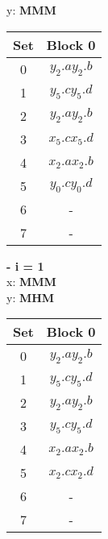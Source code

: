 \begin{enumerate}[label=\roman*. ]
y: \textbf{MMM}
\begin{table}[h!]
    \begin{tabular}{|c|c|}
    Set & Block 0 \\ \hline
    0 & $y_2.a$\quad$y_2.b$ \\ \hline
    1 & $y_5.c$\quad$y_5.d$ \\ \hline
    2 & $y_2.a$\quad$y_2.b$ \\ \hline
    3 & $x_5.c$\quad$x_5.d$ \\ \hline
    4 & $x_2.a$\quad$x_2.b$ \\ \hline
    5 & $y_0.c$\quad$y_0.d$ \\ \hline
    6 & - \\ \hline
    7 & - \\ \hline
    \end{tabular}
    \end{table}

\textbf{- i = 1}\\
x: \textbf{MMM}\\
y: \textbf{MHM}
\begin{table}[h!]
    \begin{tabular}{|c|c|}
    Set & Block 0 \\ \hline
    0 & $y_2.a$\quad$y_2.b$ \\ \hline
    1 & $y_5.c$\quad$y_5.d$ \\ \hline
    2 & $y_2.a$\quad$y_2.b$ \\ \hline
    3 & $y_5.c$\quad$y_5.d$ \\ \hline
    4 & $x_2.a$\quad$x_2.b$ \\ \hline
    5 & $x_2.c$\quad$x_2.d$ \\ \hline
    6 & - \\ \hline
    7 & - \\ \hline
    \end{tabular}
    \end{table}\\
\end{enumerate}
\clearpage
